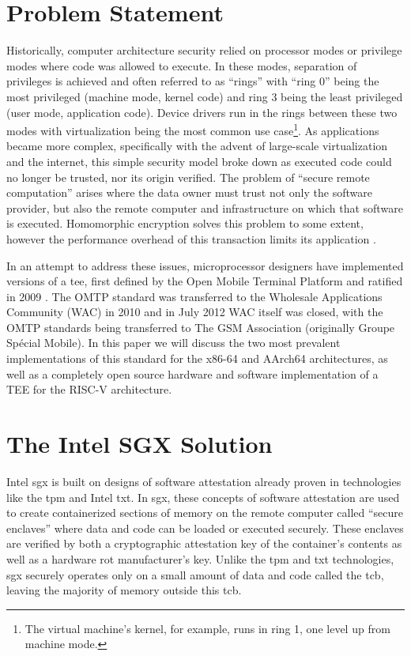 \section{Problem Statement}
Historically, computer architecture security relied on processor modes or privilege modes where code was allowed to execute. In these modes, separation of privileges is achieved and often referred to as ``rings'' with ``ring 0'' being the most privileged (machine mode, kernel code) and ring 3 being the least privileged (user mode, application code). Device drivers run in the rings between these two modes with virtualization being the most common use case\footnote{The virtual machine’s kernel, for example, runs in ring 1, one level up from machine mode.}. As applications became more complex, specifically with the advent of large-scale virtualization and the internet, this simple security model broke down as executed code could no longer be trusted, nor its origin verified. The problem of ``secure remote computation'' arises where the data owner must trust not only the software provider, but also the remote computer and infrastructure on which that software is executed. Homomorphic encryption solves this problem to some extent, however the performance overhead of this transaction limits its application \cite{Gentry01}. 

In an attempt to address these issues, microprocessor designers have implemented versions of a \gls{tee}, first defined by the Open Mobile Terminal Platform and ratified in 2009 \cite{OMTP01}. The OMTP standard was transferred to the Wholesale Applications Community (WAC) in 2010 and in July 2012 WAC itself was closed, with the OMTP standards being transferred to The GSM Association (originally Groupe Spécial Mobile)\cite{WAC}. In this paper we will discuss the two most prevalent implementations of this standard for the x86-64 and AArch64 architectures, as well as a completely open source hardware and software implementation of a TEE for the RISC-V architecture.
\section{The Intel SGX Solution}
Intel \gls{sgx} is built on designs of software attestation already proven in technologies like the \gls{tpm} and Intel \gls{txt}. In \gls{sgx}, these concepts of software attestation are used to create containerized sections of memory on the remote computer called ``secure enclaves'' where data and code can be loaded or executed securely. These enclaves are verified by both a cryptographic attestation key of the container’s contents as well as a hardware \gls{rot} manufacturer’s key. Unlike the \gls{tpm} and \gls{txt} technologies, \gls{sgx} securely operates only on a small amount of data and code called the \gls{tcb}, leaving the majority of memory outside this \gls{tcb}.

